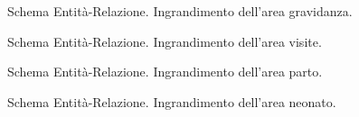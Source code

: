 \begin{figure}
    \centering
    
    \caption{Schema Entità-Relazione. Ingrandimento dell'area gravidanza.}
    \label{pregnancyerdiagram}
\end{figure}

\begin{figure}
    \centering
    
    \caption{Schema Entità-Relazione. Ingrandimento dell'area visite.}
    \label{visitserdiagram}
\end{figure}

\begin{figure}
    \centering
    
    \caption{Schema Entità-Relazione. Ingrandimento dell'area parto.}
    \label{deliveryerdiagram}
\end{figure}

\begin{figure}
    \centering
    
    \caption{Schema Entità-Relazione. Ingrandimento dell'area neonato.}
    \label{newbornerdiagram}
\end{figure}
